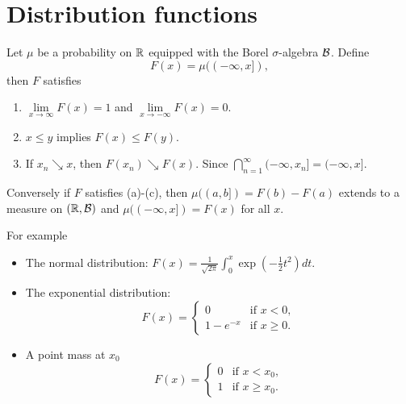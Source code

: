 \section{Distribution functions}
Let $\mu$ be a probability on ${\mathbb R}$ equipped with the Borel $\sigma$-algebra ${\mathcal{B}}$. Define 
\[F(x) = \mu((-\infty, x]), \]
then $F$ satisfies
\begin{enumerate}
    \item $\lim\limits_{x \to \infty} F(x) =1$ and $\lim\limits_{x \to - \infty}F(x) = 0$.
    \item $x \le y$ implies $F(x) \le F(y)$.
    \item If $x_n \searrow x$, then $F(x_n) \searrow F(x)$. Since $\bigcap_{n=1}^\infty (-\infty,x_n] = (-\infty, x]$.
\end{enumerate}
Conversely if $F$ satisfies (a)-(c), then $\mu((a,b]) = F(b)-F(a)$ extends to a measure on $({\mathbb R},{\mathcal{B}})$ and $\mu((-\infty, x]) = F(x)$ for all $x$. 

For example
\begin{itemize}
    \item  The normal distribution: $F(x) = \frac{1}{\sqrt{2 \pi}}\int_0^x \exp\left(-\frac{1}{2}t^2\right)dt.$
    \item The exponential distribution: \[F(x) = \begin{cases}
        0 & \text{if } x < 0,\\
        1-e^{-x} & \text{if } x \ge 0.
    \end{cases}\] 
    \item A point mass at $x_0$
    \[F(x)= \begin{cases}
        0 & \text{if } x < x_0,\\
        1 & \text{if } x \ge x_0.
    \end{cases}\] 
\end{itemize}
